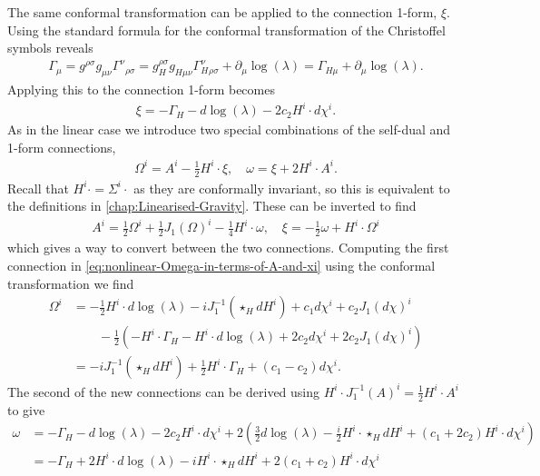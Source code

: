 \documentclass[10pt]{report}
\theoremstyle{definition}
\begin{document}
        The same conformal transformation can be applied to the connection 1-form, $\xi$. Using the standard formula for the conformal transformation of the Christoffel symbols reveals 
        \begin{align}
            \Gamma_{\mu} = g^{\rho\sigma} g_{\mu\nu} \Gamma^\nu{}_{\rho\sigma} = g_H^{\rho\sigma} g_{H\mu\nu} \Gamma_H^\nu{}_{\rho\sigma} + \partial_\mu \log(\lambda) = \Gamma_{H\mu} + \partial_\mu \log(\lambda).
        \end{align}
        Applying this to the connection 1-form becomes 
        \begin{align}
            \xi = -\Gamma_H - d\log(\lambda) - 2c_2 H^i \cdot d\chi^i.
        \end{align}
        As in the linear case we introduce two special combinations of the self-dual and 1-form connections,
        \begin{align}
            \Omega^i = A^i - \frac{1}{2} H^i \cdot \xi, \quad \omega = \xi + 2 H^i \cdot A^i. \label{eq:nonlinear-Omega-in-terms-of-A-and-xi}
        \end{align}
        Recall that $H^i \cdot = \Sigma^i \cdot$ as they are conformally invariant, so this is equivalent to the definitions in \cref{chap:Linearised-Gravity}.
        These can be inverted to find 
        \begin{align}
            A^i = \frac{1}{2} \Omega^i + \frac{1}{2}J_1(\Omega)^i - \frac{1}{4} H^i \cdot \omega, \quad \xi = -\frac{1}{2} \omega + H^i \cdot \Omega^i \label{eq:nonlinear-A-xi-to-Omega-connection}
        \end{align}
        which gives a way to convert between the two connections. Computing the first connection in \cref{eq:nonlinear-Omega-in-terms-of-A-and-xi} using the conformal transformation we find
        \begin{align}
            \Omega^i & = -\frac{1}{2} H^i \cdot d \log(\lambda) - i J_1^{-1}(\star_H dH^i) + c_1 d\chi^i + c_2 J_1(d\chi)^i \\ & \qquad -\frac{1}{2} \left( - H^i \cdot \Gamma_H - H^i \cdot d \log(\lambda) + 2 c_2 d\chi^i + 2 c_2 J_1(d\chi)^i \right) \nonumber \\
            & = -i J_1^{-1}(\star_H dH^i) + \frac{1}{2} H^i \cdot \Gamma_H + (c_1 - c_2) d\chi^i.
        \end{align}
        The second of the new connections can be derived using $H^i \cdot J_1^{-1}(A)^i = \frac{1}{2} H^i \cdot A^i$ to give
        \begin{align}
            \omega & = - \Gamma_H - d \log(\lambda) - 2 c_2 H^i \cdot d\chi^i + 2 \left( \frac{3}{2} d \log(\lambda) - \frac{i}{2} H^i \cdot \star_H dH^i + (c_1 + 2 c_2) H^i \cdot d\chi^i \right) \nonumber \\
            & = - \Gamma_H + 2 H^i \cdot d \log(\lambda) -i H^i \cdot \star_H dH^i + 2(c_1 + c_2) H^i \cdot d\chi^i
        \end{align}
\end{document}
